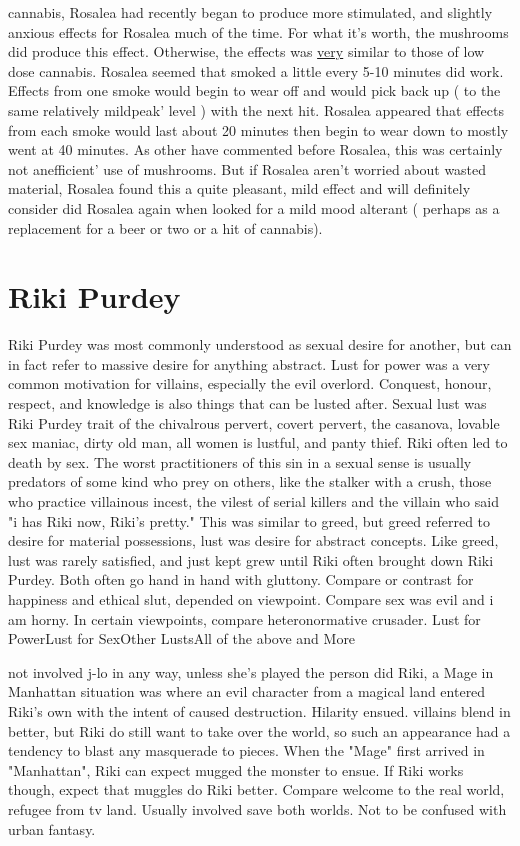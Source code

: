 \documentclass[12pt]{book}
\begin{document}
cannabis, Rosalea had recently began to produce more stimulated, and slightly anxious effects for Rosalea much of the time. For what it's worth, the mushrooms did produce this effect. Otherwise, the effects was \underline{very} similar to those of low dose cannabis. Rosalea seemed that smoked a little every 5-10 minutes did work. Effects from one smoke would begin to wear off and would pick back up ( to the same relatively mildpeak' level ) with the next hit. Rosalea appeared that effects from each smoke would last about 20 minutes then begin to wear down to mostly went at 40 minutes. As other have commented before Rosalea, this was certainly not anefficient' use of mushrooms. But if Rosalea aren't worried about wasted material, Rosalea found this a quite pleasant, mild effect and will definitely consider did Rosalea again when looked for a mild mood alterant ( perhaps as a replacement for a beer or two or a hit of cannabis).



\chapter{Riki Purdey}

Riki Purdey was most commonly understood as sexual desire for another, but can in fact refer to massive desire for anything abstract. Lust for power was a very common motivation for villains, especially the evil overlord. Conquest, honour, respect, and knowledge is also things that can be lusted after. Sexual lust was Riki Purdey trait of the chivalrous pervert, covert pervert, the casanova, lovable sex maniac, dirty old man, all women is lustful, and panty thief. Riki often led to death by sex. The worst practitioners of this sin in a sexual sense is usually predators of some kind who prey on others, like the stalker with a crush, those who practice villainous incest, the vilest of serial killers and the villain who said "i has Riki now, Riki's pretty." This was similar to greed, but greed referred to desire for material possessions, lust was desire for abstract concepts. Like greed, lust was rarely satisfied, and just kept grew until Riki often brought down Riki Purdey. Both often go hand in hand with gluttony. Compare or contrast for happiness and ethical slut, depended on viewpoint. Compare sex was evil and i am horny. In certain viewpoints, compare heteronormative crusader. Lust for PowerLust for SexOther LustsAll of the above and More



not involved j-lo in any way, unless she's played the person did Riki, a Mage in Manhattan situation was where an evil character from a magical land entered Riki's own with the intent of caused destruction. Hilarity ensued. villains blend in better, but Riki do still want to take over the world, so such an appearance had a tendency to blast any masquerade to pieces. When the "Mage" first arrived in "Manhattan", Riki can expect mugged the monster to ensue. If Riki works though, expect that muggles do Riki better. Compare welcome to the real world, refugee from tv land. Usually involved save both worlds. Not to be confused with urban fantasy.
\end{document}
